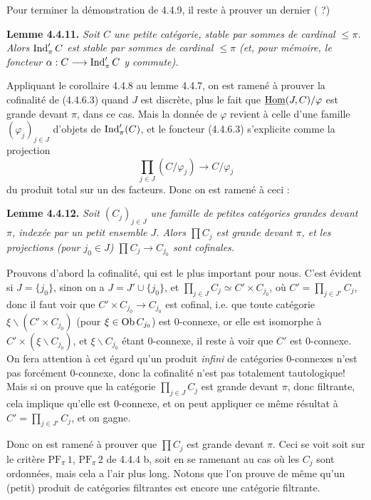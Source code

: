 Pour terminer la démonstration de 4.4.9, il reste à prouver un dernier ( ?)

\textbf{Lemme 4.4.11.} \textit{Soit $C$ une petite catégorie, stable par sommes de cardinal $\leqslant \pi$. Alors $\operatorname{Ind}'_\pi C$ est stable par sommes de cardinal $\leqslant \pi$ (et, pour mémoire, le foncteur $\alpha : C \longrightarrow \operatorname{Ind}'_\pi C$ y commute).}

Appliquant le corollaire 4.4.8 au lemme 4.4.7, on est ramené à prouver la cofinalité de (4.4.6.3) quand $J$ est discrète, plus le fait que $\underline{\mathrm{Hom}}(J,C)/\varphi$ est grande devant $\pi$, dans ce cas. Mais la donnée de $\varphi$ revient à celle d'une famille $(\varphi_j)_{j\in J}$ d'objets de $\operatorname{Ind}'_\pi(C)$, et le foncteur (4.4.6.3) s'explicite comme la projection
\[
\prod_{j\in J} (C/\varphi_j) \longrightarrow C/\varphi_j
\]
du produit total sur un des facteurs. Donc on est ramené à ceci :

\textbf{Lemme 4.4.12.} \textit{Soit $(C_j)_{j\in J}$ une famille de petites catégories grandes devant $\pi$, indexée par un petit ensemble $J$. Alors $\prod C_j$ est grande devant $\pi$, et les projections (pour $j_0 \in J$) $\prod C_j \longrightarrow C_{j_0}$ sont cofinales.}

Prouvons d'abord la cofinalité, qui est le plus important pour nous. C'est évident si $J = \{j_0\}$, sinon on a $J = J' \cup \{j_0\}$, et $\prod_{j\in J} C_j \simeq C' \times C_{j_0}$, où $C' = \prod_{j\in J'} C_j$, donc il faut voir que $C' \times C_{j_0} \longrightarrow C_{j_0}$ est cofinal, i.e. que toute catégorie $\xi\backslash(C' \times C_{j_0})$ (pour $\xi \in \mathrm{Ob}\, C_{j_0}$) est 0-connexe, or elle est isomorphe à $C' \times (\xi\backslash C_{j_0})$, et $\xi\backslash C_{j_0}$ étant 0-connexe, il reste à voir que $C'$ est 0-connexe. On fera attention à cet égard qu'un produit \textit{infini} de catégories 0-connexes n'est pas forcément 0-connexe, donc la cofinalité n'est pas totalement tautologique! Mais si on prouve que la catégorie $\prod_{j\in J} C_j$ est
grande devant $\pi$, donc filtrante, cela implique qu'elle est 0-connexe, et on peut appliquer ce même résultat à $C' = \prod_{j\in J'} C_j$, et on gagne.

Donc on est ramené à prouver que $\prod C_j$ est grande devant $\pi$. Ceci se voit soit sur le critère $\mathrm{PF}_\pi\,1$, $\mathrm{PF}_\pi\,2$ de 4.4.4 b, soit en se ramenant au cas où les $C_j$ sont ordonnées, mais cela a l'air plus long. Notons que l'on prouve de même qu'un (petit) produit de catégories filtrantes est encore une catégorie filtrante.

